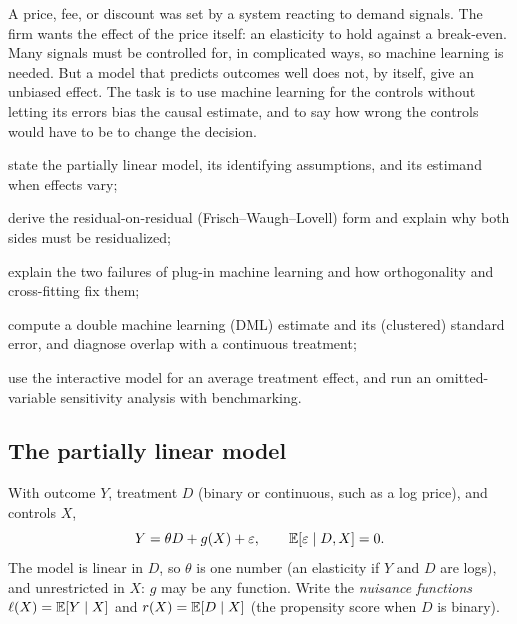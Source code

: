 \documentclass[11pt]{article}
\begin{document}

\begin{decision}
A price, fee, or discount was set by a system reacting to demand signals. The firm wants the effect of the price itself: an
elasticity to hold against a break-even. Many signals must be controlled for, in complicated ways, so machine learning is
needed. But a model that predicts outcomes well does not, by itself, give an unbiased effect. The task is to use machine
learning for the controls without letting its errors bias the causal estimate, and to say how wrong the controls would have to be
to change the decision.
\end{decision}

\begin{goals}
  \item state the partially linear model, its identifying assumptions, and its estimand when effects vary;
  \item derive the residual-on-residual (Frisch--Waugh--Lovell) form and explain why both sides must be residualized;
  \item explain the two failures of plug-in machine learning and how orthogonality and cross-fitting fix them;
  \item compute a double machine learning (DML) estimate and its (clustered) standard error, and diagnose overlap with a
  continuous treatment;
  \item use the interactive model for an average treatment effect, and run an omitted-variable sensitivity analysis with
  benchmarking.
\end{goals}

\sectionone

\subsection{The partially linear model}

With outcome $Y$, treatment $D$ (binary or continuous, such as a log price), and controls $X$,
\[
  Y = \theta D + g(X) + \varepsilon, \qquad \mathbb{E}[\varepsilon \mid D, X] = 0 .
\]
The model is linear in $D$, so $\theta$ is one number (an elasticity if $Y$ and $D$ are logs), and unrestricted in $X$: $g$ may be
any function. Write the \emph{nuisance functions} $\ell(X) = \mathbb{E}[Y \mid X]$ and $r(X) = \mathbb{E}[D \mid X]$ (the propensity score when $D$ is
binary).
\end{document}
